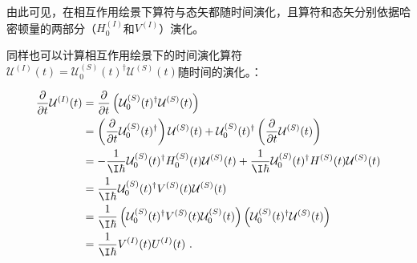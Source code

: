 由此可见，在相互作用绘景下算符与态矢都随时间演化，且算符和态矢分别依据哈密顿量的两部分（$H_0^{(I)}$和$V^{(I)}$）演化。

同样也可以计算相互作用绘景下的时间演化算符$\mathcal U^{(I)}(t)=\mathcal U^{(S)}_0(t)^\dagger\mathcal U^{(S)}(t)$随时间的演化。：

\begin{align}
\frac{\partial}{\partial t}\mathcal U^{(I)}(t)&=
\frac{\partial}{\partial t}\left(\mathcal U^{(S)}_0(t)^\dagger\mathcal U^{(S)}(t)\right)\\
&=\left(\frac{\partial}{\partial t}\mathcal U^{(S)}_0(t)^\dagger\right)\mathcal U^{(S)}(t)+\mathcal U^{(S)}_0(t)^\dagger\left(\frac{\partial}{\partial t}\mathcal U^{(S)}(t)\right) \\
&=-\frac{1}{\I\hbar}\mathcal U^{(S)}_0(t)^\dagger H^{(S)}_0(t)\mathcal U^{(S)}(t)+\frac{1}{\I\hbar}\mathcal U^{(S)}_0(t)^\dagger H^{(S)}(t)\mathcal U^{(S)}(t)  \\
&=\frac{1}{\I\hbar}\mathcal U^{(S)}_0(t)^\dagger V^{(S)}(t)\mathcal U^{(S)}(t)  \\
&=\frac{1}{\I\hbar}\left(\mathcal U^{(S)}_0(t)^\dagger V^{(S)}(t)\mathcal U^{(S)}_0(t)\right)\left(\mathcal U^{(S)}_0(t)^\dagger\mathcal U^{(S)}(t) \right) \\
&=\frac{1}{\I\hbar}V^{(I)}(t)U^{(I)}(t)~.
\end{align}


